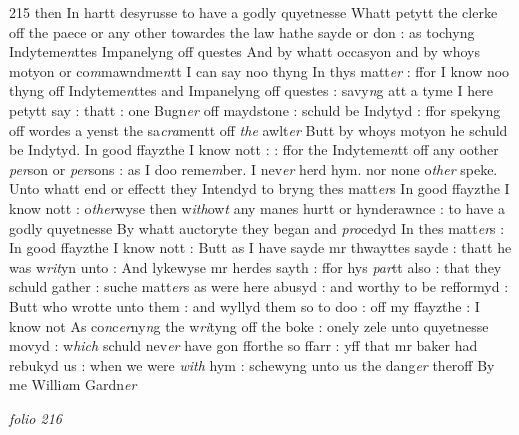 \documentclass[12pt, a4paper]{book}
\begin{document}
{\color{Mahogany}215} then In hartt desyrusse to have a godly quyetnesse Whatt petytt the clerke off the paece or any other towardes the law hathe  sayde or don : as tochyng Indyteme\textit{n}ttes Impanelyng off questes And by whatt occasyon and by whoys motyon or co\textit{m}mawndme\textit{n}tt I can say noo thyng In thys matt\textit{er }: ffor I know noo thyng off Indyteme\textit{n}ttes and Impanelyng off questes : savy\textit{n}g att a tyme I here petytt say : thatt : one Bugn\textit{er} off maydstone : schuld be  Indytyd : ffor spekyng off wordes a yenst the sa\textit{cra}mentt off \textit{the} awlt\textit{er} Butt by whoys motyon he schuld be Indytyd. In good ffayzthe I  know nott : : ffor the Indyteme\textit{n}tt off any oother \textit{per}son or \textit{per}sons :  as I doo reme\textit{m}ber. I nev\textit{er} herd hym. nor none o\textit{ther} speke. Unto whatt end or effectt they Intendyd to bryng thes matt\textit{er}s  In good ffayzthe I know nott : o\textit{ther}wyse then w\textit{ith}ow\textit{t} any manes hurtt or hynderawnce : to have a godly quyetnesse By whatt auctoryte they began and \textit{pro}cedyd In thes matt\textit{er}s : 
				\marginpar[\vspace{0.5cm}{\textcolor{Gray}{Twaith hardes}}]{}
			 In good ffayzthe I know nott : Butt as I have sayde mr thwayttes sayde : thatt he was w\textit{rit}yn unto : And lykewyse mr herdes sayth : ffor hys \textit{par}tt also : that they schuld gather : suche matt\textit{er}s as were here abusyd : and worthy to be refformyd : Butt who wrotte unto them : and wyllyd them so to doo : off my ffayzthe : I know not As co\textit{n}c\textit{er}ny\textit{n}g the w\textit{ri}tyng off the boke : onely zele unto quyetnesse movyd : w\textit{hich} schuld nev\textit{er} have gon fforthe so ffarr : yff that mr baker had  rebukyd us : when we were \textit{with} hym : schewyng unto us the dang\textit{er }theroff By me Willi\textit{a}m Gardn\textit{er}
               
\dotfill
					

\textit{folio 216}


         \vspace{4cm}
         
\dotfill
					  \section*{}  \subsection*{}
\end{document}
